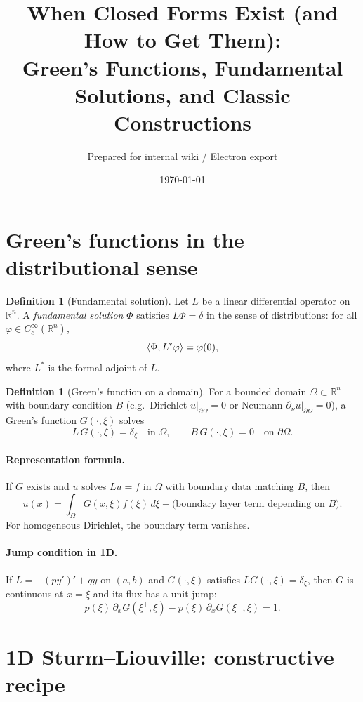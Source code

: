 \documentclass[11pt]{article}
\title{When Closed Forms Exist (and How to Get Them):\\
	Green's Functions, Fundamental Solutions, and Classic Constructions}
\author{Prepared for internal wiki / Electron export}
\date{\today}
\theoremstyle{definition}
\newtheorem{definition}[theorem]{Definition}
\theoremstyle{remark}
\newcommand{\Om}{\Omega}
\DeclarePairedDelimiter{\ang}{\langle}{\rangle}
\begin{document}
	\maketitle
	
	\tableofcontents
	
	\section{Green's functions in the distributional sense}
	
\begin{definition}[Fundamental solution]
	Let $L$ be a linear differential operator on $\mathbb{R}^n$. 
	A \emph{fundamental solution} $\Phi$ satisfies $L\Phi=\delta$ in the sense of distributions: 
	for all $\varphi\in C_c^\infty(\mathbb{R}^n)$,
	\[
	\ang{\Phi, L^*\varphi}=\varphi(0),
	\]
	where $L^*$ is the formal adjoint of $L$.
\end{definition}

\begin{definition}[Green's function on a domain]
	For a bounded domain $\Omega\subset\mathbb{R}^n$ with boundary condition $B$ (e.g.\ Dirichlet 
	$u|_{\partial\Omega}=0$ or Neumann $\partial_\nu u|_{\partial\Omega}=0$), a Green's function $G(\cdot,\xi)$ solves
	\[
	L\,G(\cdot,\xi)=\delta_\xi \quad\text{in }\Omega,\qquad
	B\,G(\cdot,\xi)=0\quad\text{on }\partial\Omega.
	\]
\end{definition}
	
	\paragraph{Representation formula.}
	If $G$ exists and $u$ solves $Lu=f$ in $\Om$ with boundary data matching $B$, then
	\[
	u(x)=\int_\Om G(x,\xi)f(\xi)\,d\xi + \text{(boundary layer term depending on $B$)}.
	\]
	For homogeneous Dirichlet, the boundary term vanishes.
	
	\paragraph{Jump condition in 1D.}
	If $L=-(p y')'+q y$ on $(a,b)$ and $G(\cdot,\xi)$ satisfies $L G(\cdot,\xi)=\delta_\xi$,
	then $G$ is continuous at $x=\xi$ and its flux has a unit jump:
	\[
	p(\xi)\,\partial_x G(\xi^+,\xi)-p(\xi)\,\partial_x G(\xi^-,\xi)=1.
	\]
	
	\section{1D Sturm--Liouville: constructive recipe}
	
\end{document}
